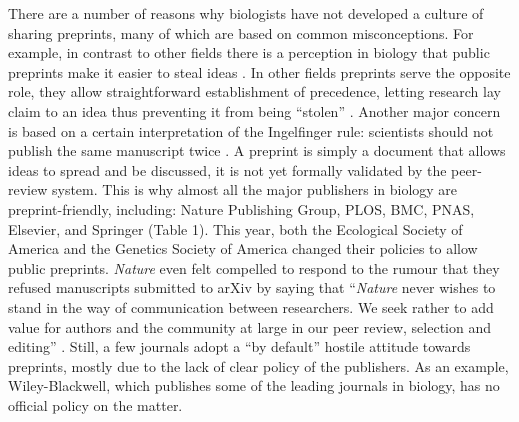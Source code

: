 \documentclass[letterpaper]{article}
\begin{document}
There are a number of reasons why biologists have not developed a culture of
sharing preprints, many of which are based on common misconceptions. For
example, in contrast to other fields there is a perception in biology that
public preprints make it easier to steal ideas \cite{gin11}. In other fields
preprints serve the opposite role, they allow straightforward establishment
of precedence, letting research lay claim to an idea thus preventing it from
being ``stolen'' \cite{gin11}. Another major concern is based on a certain
interpretation of the Ingelfinger rule: scientists should not publish the
same manuscript twice \cite{alt96}. A preprint is simply a document that
allows ideas to spread and be discussed, it is not yet formally validated by
the peer-review system. This is why almost all the major publishers in
biology are preprint-friendly, including: Nature Publishing Group, PLOS,
BMC, PNAS, Elsevier, and Springer (Table 1). This year, both the Ecological
Society of America and the Genetics Society of America changed their
policies to allow public preprints. \emph{Nature} even felt compelled to
respond to the rumour that they refused manuscripts submitted to arXiv by
saying that ``\emph{Nature} never wishes to stand in the way of
communication between researchers. We seek rather to add value for authors
and the community at large in our peer review, selection and editing'' \cite
{nat05}. Still, a few journals adopt a ``by default'' hostile attitude
towards preprints, mostly due to the lack of clear policy of the publishers.
As an example, Wiley-Blackwell, which publishes some of the leading journals
in biology, has no official policy on the matter.
\end{document}
